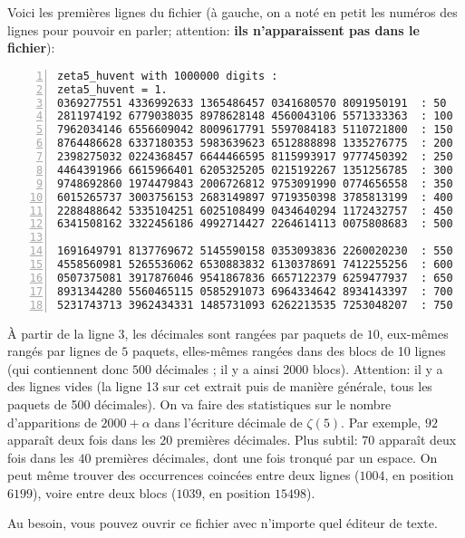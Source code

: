 Voici les premières lignes du fichier (à gauche, on a noté en petit
les numéros des lignes pour pouvoir en parler; attention: \textbf{ils n'apparaissent pas
dans le fichier}):
\begin{Verbatim}[numbers=left]
zeta5_huvent with 1000000 digits : 
zeta5_huvent = 1.
0369277551 4336992633 1365486457 0341680570 8091950191  : 50
2811974192 6779038035 8978628148 4560043106 5571333363  : 100
7962034146 6556609042 8009617791 5597084183 5110721800  : 150
8764486628 6337180353 5983639623 6512888898 1335276775  : 200
2398275032 0224368457 6644466595 8115993917 9777450392  : 250
4464391966 6615966401 6205325205 0215192267 1351256785  : 300
9748692860 1974479843 2006726812 9753091990 0774656558  : 350
6015265737 3003756153 2683149897 9719350398 3785813199  : 400
2288488642 5335104251 6025108499 0434640294 1172432757  : 450
6341508162 3322456186 4992714427 2264614113 0075808683  : 500

1691649791 8137769672 5145590158 0353093836 2260020230  : 550
4558560981 5265536062 6530883832 6130378691 7412255256  : 600
0507375081 3917876046 9541867836 6657122379 6259477937  : 650
8931344280 5560465115 0585291073 6964334642 8934143397  : 700
5231743713 3962434331 1485731093 6262213535 7253048207  : 750
\end{Verbatim}

À partir  de la  ligne 3,  les décimales sont  rangées par  paquets de
$10$, eux-mêmes rangés par lignes  de $5$ paquets, elles-mêmes rangées
dans des blocs de 10 lignes (qui contiennent donc $500$ décimales ; il
y a ainsi $2000$ blocs).  Attention: il y a des lignes vides (la ligne
13 sur cet  extrait puis de manière générale, tous  les paquets de 500
décimales). On va faire des statistiques sur le nombre d'apparitions de
$2000 + \alpha$ dans l'écriture  décimale de $\zeta(5)$.  Par exemple,
$92$ apparaît deux fois dans les $20$ premières décimales. Plus subtil:
$70$ apparaît  deux fois dans  les $40$ premières décimales,  dont une
fois  tronqué par  un  espace.  On peut  même  trouver des  occurrences
coincées entre deux lignes ($1004$,  en position $6199$), voire entre
deux blocs ($1039$, en position $15498$).

Au besoin, vous pouvez ouvrir ce fichier avec n'importe quel éditeur
de texte.




